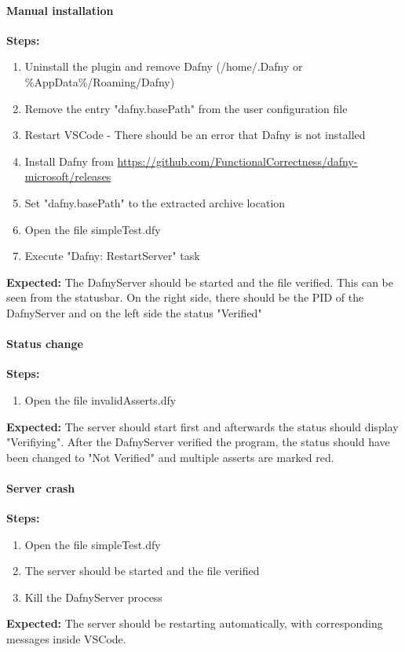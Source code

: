 \paragraph{Manual installation}
\textbf{\newline Steps:}
\begin{enumerate}
\item Uninstall the plugin and remove Dafny (/home/.Dafny or \%AppData\%/Roaming/Dafny)
\item Remove the entry "dafny.basePath" from the user configuration file 
\item Restart VSCode - There should be an error that Dafny is not installed
\item Install Dafny from \href{https://github.com/FunctionalCorrectness/dafny-microsoft/releases}{https://github.com/FunctionalCorrectness/dafny-microsoft/releases}
\item Set "dafny.basePath" to the extracted archive location
\item Open the file simpleTest.dfy
\item Execute "Dafny: RestartServer" task
\end{enumerate}
\textbf{\newline Expected:}
The DafnyServer should be started and the file verified. This can be seen from the statusbar. On the right side, there should be the PID of the DafnyServer and on the left side the status "Verified"

\paragraph{Status change}
\textbf{\newline Steps:}
\begin{enumerate}
	\item Open the file invalidAsserts.dfy

\end{enumerate}
\textbf{\newline Expected:}
The server should start first and afterwards the status should display "Verifiying". After the DafnyServer verified the program, the status should have been changed to "Not Verified" and multiple asserts are marked red. 

\paragraph{Server crash}
\textbf{\newline Steps:}
\begin{enumerate}
	\item Open the file simpleTest.dfy
	\item The server should be started and the file verified
	\item Kill the DafnyServer process
	
\end{enumerate}
\textbf{\newline Expected:}
The server should be restarting automatically, with corresponding messages inside VSCode. 

